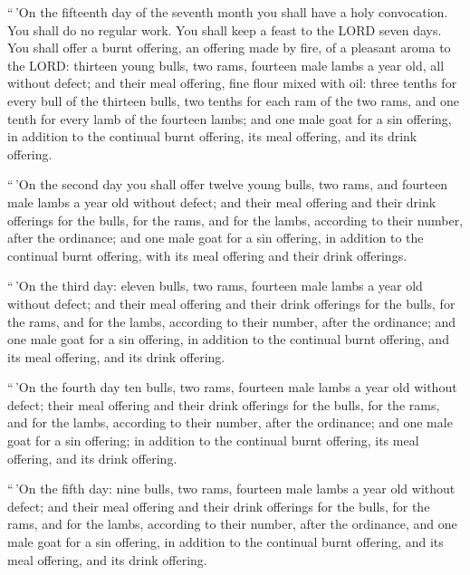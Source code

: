  ``\,'On the fifteenth day of the seventh month you shall
have a holy convocation. You shall do no regular work. You shall keep a
feast to the LORD seven days.  You shall offer a burnt
offering, an offering made by fire, of a pleasant aroma to the LORD:
thirteen young bulls, two rams, fourteen male lambs a year old, all
without defect;  and their meal offering, fine flour
mixed with oil: three tenths for every bull of the thirteen bulls, two
tenths for each ram of the two rams,  and one tenth for
every lamb of the fourteen lambs;  and one male goat for
a sin offering, in addition to the continual burnt offering, its meal
offering, and its drink offering.

 ``\,'On the second day you shall offer twelve young
bulls, two rams, and fourteen male lambs a year old without defect;
 and their meal offering and their drink offerings for
the bulls, for the rams, and for the lambs, according to their number,
after the ordinance;  and one male goat for a sin
offering, in addition to the continual burnt offering, with its meal
offering and their drink offerings.

 ``\,'On the third day: eleven bulls, two rams, fourteen
male lambs a year old without defect;  and their meal
offering and their drink offerings for the bulls, for the rams, and for
the lambs, according to their number, after the ordinance;
 and one male goat for a sin offering, in addition to the
continual burnt offering, and its meal offering, and its drink offering.

 ``\,'On the fourth day ten bulls, two rams, fourteen
male lambs a year old without defect;  their meal
offering and their drink offerings for the bulls, for the rams, and for
the lambs, according to their number, after the ordinance;
 and one male goat for a sin offering; in addition to the
continual burnt offering, its meal offering, and its drink offering.

 ``\,'On the fifth day: nine bulls, two rams, fourteen
male lambs a year old without defect;  and their meal
offering and their drink offerings for the bulls, for the rams, and for
the lambs, according to their number, after the ordinance,
 and one male goat for a sin offering, in addition to the
continual burnt offering, and its meal offering, and its drink offering.

